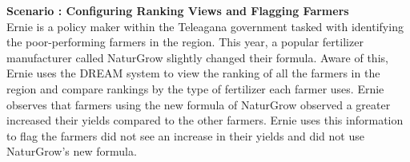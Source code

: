 
\begin{flushleft}
\textbf{Scenario : Configuring Ranking Views and Flagging Farmers}\\\smallskip
Ernie is a policy maker within the Teleagana government tasked with identifying the poor-performing farmers in the region. This year, a popular fertilizer manufacturer called NaturGrow slightly changed their formula. Aware of this, Ernie uses the DREAM system to view the ranking of all the farmers in the region and compare rankings by the type of fertilizer each farmer uses. Ernie observes that farmers using the new formula of NaturGrow observed a greater increased their yields compared to the other farmers. Ernie uses this information to flag the farmers did not see an increase in their yields and did not use NaturGrow's new formula. 
\end{flushleft}
